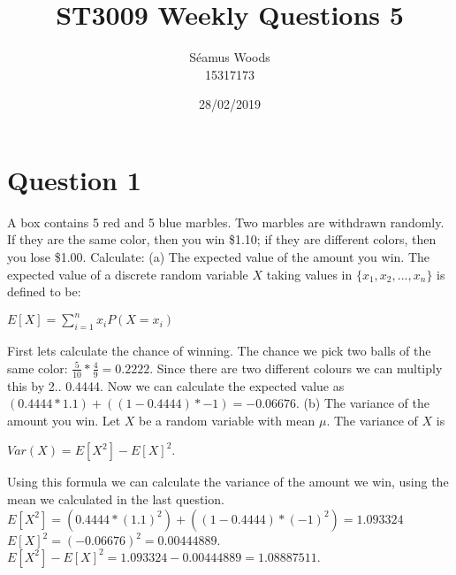 \documentclass[12pt]{report}
\title{ST3009 Weekly Questions 5}
\author{Séamus Woods \\ 15317173}
\date{28/02/2019}
\begin{document}
\maketitle
\newpage

\section{Question 1}
A box contains 5 red and 5 blue marbles. Two marbles are withdrawn randomly. If they are the same color, then you win \$1.10; if they are different colors, then you lose \$1.00. Calculate:
\newline
\newline
(a) The expected value of the amount you win.
\newline
The expected value of a discrete random variable $X$ taking values in $\{x_1, x_2,...,x_n\}$ is defined to be:
\begin{center}
$E[X] = \sum\limits_{i=1}^n x_i P(X = x_i)$
\end{center}
First lets calculate the chance of winning. The chance we pick two balls of the same color: $\frac{5}{10} * \frac{4}{9} = 0.2222$. Since there are two different colours we can multiply this by 2.. 0.4444. Now we can calculate the expected value as $(0.4444 * 1.1) + ((1-0.4444) * -1) = -0.06676$.
\newline
\newline
(b) The variance of the amount you win.
\newline
Let $X$ be a random variable with mean $\mu$. The variance of $X$ is 
\begin{center}
$Var(X) = E[X^2] - E[X]^2$.
\end{center}
Using this formula we can calculate the variance of the amount we win, using the mean we calculated in the last question. 
\newline
$E[X^2] = (0.4444 * (1.1)^2) + ((1-0.4444) * (-1)^2) = 1.093324$
\newline
$E[X]^2 = (-0.06676)^2 = 0.00444889.$
\newline
$E[X^2] - E[X]^2 = 1.093324 - 0.00444889 = 1.08887511.$
\end{document}
